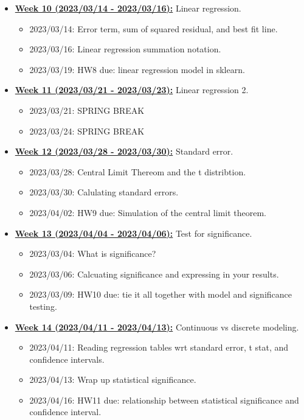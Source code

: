 \documentclass[11pt]{article}
\begin{document}
\begin{itemize}
  \item \underline{\textbf{Week 10 (2023/03/14 - 2023/03/16):}} Linear regression. 
  \begin{itemize}
    \item 2023/03/14: Error term, sum of squared residual, and best fit line. 
    \item 2023/03/16: Linear regression summation notation. 
    \item 2023/03/19: HW8 due: linear regression model in sklearn.
  \end{itemize}


  \item \underline{\textbf{Week 11 (2023/03/21 - 2023/03/23):}} Linear regression 2. 
  \begin{itemize}
    \item 2023/03/21: SPRING BREAK
    \item 2023/03/24: SPRING BREAK
  \end{itemize}


  \item \underline{\textbf{Week 12 (2023/03/28 - 2023/03/30):}} Standard error. 
  \begin{itemize}
    \item 2023/03/28: Central Limit Thereom and the t distribtion. 
    \item 2023/03/30: Calulating standard errors. 
    \item 2023/04/02: HW9 due: Simulation of the central limit theorem.
  \end{itemize}


  \item \underline{\textbf{Week 13 (2023/04/04 - 2023/04/06):}} Test for significance. 
  \begin{itemize}
    \item 2023/03/04: What is significance?
    \item 2023/03/06: Calcuating significance and expressing in your results. 
    \item 2023/03/09: HW10 due: tie it all together with model and significance testing. 
  \end{itemize}


  \item \underline{\textbf{Week 14 (2023/04/11 - 2023/04/13):}} Continuous vs discrete modeling. 
  \begin{itemize}
    \item 2023/04/11: Reading regression tables wrt standard error, t stat, and confidence intervals.   
    \item 2023/04/13: Wrap up statistical significance. 
    \item 2023/04/16: HW11 due: relationship between statistical significance and confidence interval. 
  \end{itemize}



\end{itemize}
\end{document}
